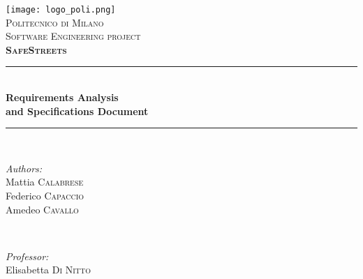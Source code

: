 \begin{titlepage}
\newcommand{\HRule}{\rule{\linewidth}{0.5mm}} %

\center %
 
\texttt{[image: logo\_poli.png]}\\[0.5cm] %
\textsc{\LARGE Politecnico di Milano}\\[2cm] %
\textsc{\Large Software Engineering  project}\\[0.5cm] %
\textsc{\large \textbf{SafeStreets}}\\[1.5cm] %


\HRule \\[0.4cm]
{ \huge \bfseries Requirements Analysis\\ and Specifications Document}\\[0.4cm] %
\HRule \\[1.5cm]
 

\begin{minipage}{0.4\textwidth}
\begin{flushleft} \large
\emph{Authors:}\\
Mattia \textsc{Calabrese}\\
Federico \textsc{Capaccio}\\
Amedeo \textsc{Cavallo} %
\end{flushleft}
\end{minipage}
~
\begin{minipage}{0.4\textwidth}
\begin{flushright} \large
\emph{Professor:} \\
Elisabetta \textsc{Di Nitto} %
\end{flushright}
\end{minipage}\\[2cm]


\end{titlepage}
